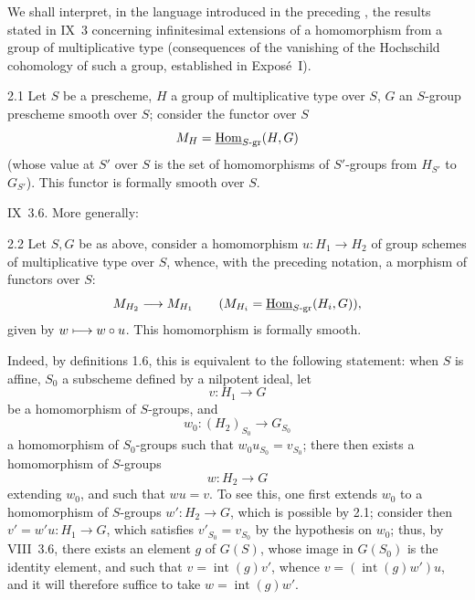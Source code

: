 We shall interpret, in the language introduced in the preceding \No, the results stated in IX~3 concerning infinitesimal extensions of a homomorphism from a group of multiplicative type (consequences of the vanishing of the Hochschild cohomology of such a group, established in Exposé~I).
\begin{proposition}{2.1}\label{XI.2.1}
Let $S$ be a prescheme, $H$ a group of multiplicative type over $S$, $G$ an $S$-group prescheme smooth over $S$; consider the functor over $S$
\[
M_H=\underline{\operatorname{Hom}}_{S\text{-gr}}(H,G)
\]
(whose value at $S'$ over $S$ is the set of homomorphisms of $S'$-groups from $H_{S'}$ to $G_{S'}$). This functor is formally smooth over $S$.
\end{proposition}
\Cf IX~3.6. More generally:
\begin{corollary}{2.2}\label{XI.2.2}
Let $S,G$ be as above, consider a homomorphism $u:H_1\to H_2$ of group schemes of multiplicative type over $S$, whence, with the preceding notation, a morphism of functors over $S$:
\[
M_{H_2}\longrightarrow M_{H_1}\qquad(M_{H_i}=\underline{\operatorname{Hom}}_{S\text{-gr}}(H_i,G)),
\]
given by $w\longmapsto w\circ u$. This homomorphism is formally smooth.
\end{corollary}
Indeed, by definitions 1.6, this is equivalent to the following statement: when $S$ is affine, $S_0$ a subscheme defined by a nilpotent ideal, let
\[
v:H_1\to G
\]
be a homomorphism of $S$-groups, and
\[
w_0:(H_2)_{S_0}\to G_{S_0}
\]
a homomorphism of $S_0$-groups such that $w_0u_{S_0}=v_{S_0}$; there then exists a homomorphism of $S$-groups
\[
w:H_2\to G
\]
extending $w_0$, and such that $wu=v$. To see this, one first extends $w_0$ to a homomorphism of $S$-groups $w':H_2\to G$, which is possible by 2.1; consider then $v'=w'u:H_1\to G$, which satisfies $v'_{S_0}=v_{S_0}$ by the hypothesis on $w_0$; thus, by VIII~3.6, there exists an element $g$ of $G(S)$, whose image in $G(S_0)$ is the identity element, and such that $v=\operatorname{int}(g)v'$, whence $v=(\operatorname{int}(g)w')u$, and it will therefore suffice to take $w=\operatorname{int}(g)w'$.

